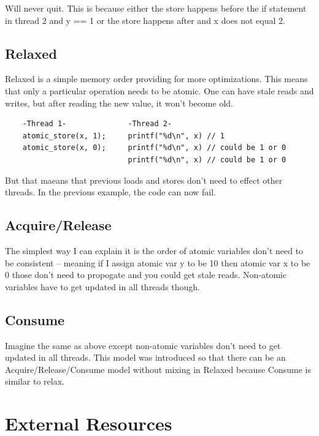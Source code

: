 Will never quit.
This is because either the store happens before the if statement in thread 2 and y == 1 or the store happens after and x does not equal 2.

\subsection{Relaxed}

Relaxed is a simple memory order providing for more optimizations.
This means that only a particular operation needs to be atomic.
One can have stale reads and writes, but after reading the new value, it won't become old.

\begin{verbatim}
    -Thread 1-              -Thread 2-
    atomic_store(x, 1);     printf("%d\n", x) // 1
    atomic_store(x, 0);     printf("%d\n", x) // could be 1 or 0
                            printf("%d\n", x) // could be 1 or 0
\end{verbatim}

But that maeans that previous loads and stores don't need to effect other threads.
In the previous example, the code can now fail.

\subsection{Acquire/Release}

The simplest way I can explain it is the order of atomic variables don't need to be consistent -- meaning if I assign atomic var y to be 10 then atomic var x to be 0 those don't need to propogate and you could get stale reads.
Non-atomic variables have to get updated in all threads though.

\subsection{Consume}

Imagine the same as above except non-atomic variables don't need to get updated in all threads.
This model was introduced so that there can be an Acquire/Release/Consume model without mixing in Relaxed because Consume is similar to relax.

\section{External Resources}

